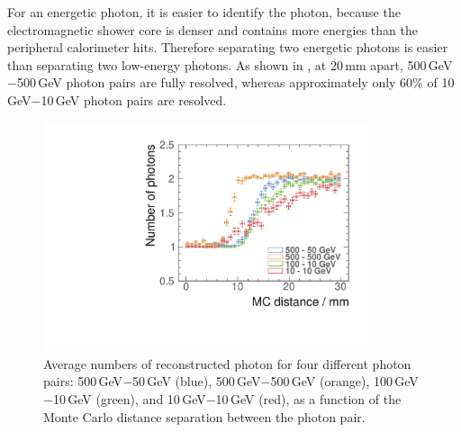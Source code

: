 For an energetic photon, it is easier to identify the photon, because the electromagnetic shower core is denser and contains more energies than the peripheral calorimeter hits. Therefore separating two energetic photons is easier than separating two low-energy photons. As shown in , at 20\,mm apart, 500\,GeV$-$500\,GeV photon pairs are fully resolved, whereas approximately only 60\% of 10\,GeV$-$10\,GeV photon pairs are resolved.

\begin{figure}[tbph]
\centering
        \includegraphics[width=0.85\textwidth]{photon/DoubleCompareEnergies.pdf}
        \caption{Average numbers of reconstructed photon for four different photon pairs: 500\,GeV$-$50\,GeV (blue), 500\,GeV$-$500\,GeV (orange), 100\,GeV$-$10\,GeV (green), and 10\,GeV$-$10\,GeV (red), as a function of the Monte Carlo distance separation between the photon pair.}
        \label{fig:photonDoubleCompareEnergies}
\end{figure}

